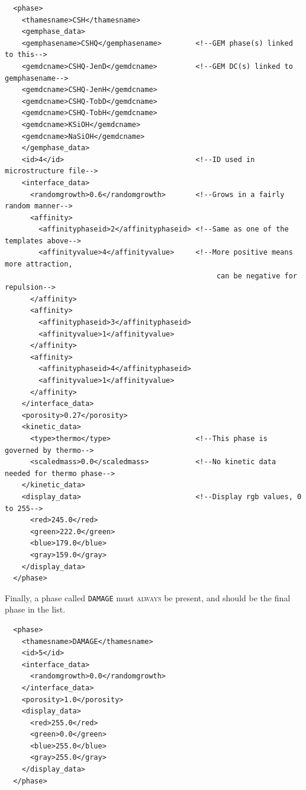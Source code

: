 \documentclass{article}
\begin{document}
\scriptsize{
    \begin{lstlisting}
  <phase>
    <thamesname>CSH</thamesname>
    <gemphase_data>
    <gemphasename>CSHQ</gemphasename>        <!--GEM phase(s) linked to this-->
    <gemdcname>CSHQ-JenD</gemdcname>         <!--GEM DC(s) linked to gemphasename-->
    <gemdcname>CSHQ-JenH</gemdcname>
    <gemdcname>CSHQ-TobD</gemdcname>
    <gemdcname>CSHQ-TobH</gemdcname>
    <gemdcname>KSiOH</gemdcname>
    <gemdcname>NaSiOH</gemdcname>
    </gemphase_data>
    <id>4</id>                               <!--ID used in microstructure file-->
    <interface_data>
      <randomgrowth>0.6</randomgrowth>       <!--Grows in a fairly random manner-->
      <affinity>
        <affinityphaseid>2</affinityphaseid> <!--Same as one of the templates above-->
        <affinityvalue>4</affinityvalue>     <!--More positive means more attraction,
                                                  can be negative for repulsion-->
      </affinity>
      <affinity>
        <affinityphaseid>3</affinityphaseid>
        <affinityvalue>1</affinityvalue> 
      </affinity>
      <affinity>
        <affinityphaseid>4</affinityphaseid>
        <affinityvalue>1</affinityvalue>
      </affinity>
    </interface_data>
    <porosity>0.27</porosity>
    <kinetic_data>
      <type>thermo</type>                    <!--This phase is governed by thermo-->
      <scaledmass>0.0</scaledmass>           <!--No kinetic data needed for thermo phase-->
    </kinetic_data>
    <display_data>                           <!--Display rgb values, 0 to 255-->
      <red>245.0</red>
      <green>222.0</green>
      <blue>179.0</blue>
      <gray>159.0</gray>
    </display_data>
  </phase>

    \end{lstlisting}
}

\normalsize{ }

Finally, a phase called \verb!DAMAGE! must \textsc{always} be present, and
should be the final phase in the list.

\scriptsize{
    \begin{lstlisting}
  <phase>
    <thamesname>DAMAGE</thamesname>
    <id>5</id>
    <interface_data>
      <randomgrowth>0.0</randomgrowth>
    </interface_data>
    <porosity>1.0</porosity>
    <display_data>
      <red>255.0</red>
      <green>0.0</green>
      <blue>255.0</blue>
      <gray>255.0</gray>
    </display_data>
  </phase>
    \end{lstlisting}
}
\end{document}
